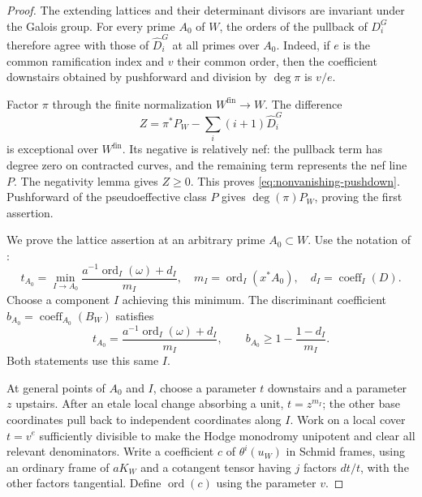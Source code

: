 \begin{proof}
The extending lattices and their determinant divisors are invariant
under the Galois group.  For every prime $A_0$ of $W$, the orders of the
pullback of $D_i^G$ therefore agree with those of $\widehat D_i^G$ at all
primes over $A_0$.  Indeed, if $e$ is the common ramification index and
$v$ their common order, then the coefficient downstairs obtained by
pushforward and division by $\deg\pi$ is $v/e$.

Factor $\pi$ through the finite normalization $W^{\mathrm{fin}}\to W$.
The difference
\[
                    Z=\pi^*P_W-\sum_i(i+1)\widehat D_i^G
\]
is exceptional over $W^{\mathrm{fin}}$.  Its negative is relatively nef:
the pullback term has degree zero on contracted curves, and the remaining
term represents the nef line $P$.  The negativity lemma
\cite[Lemma~3.39]{KollarMori} gives $Z\ge0$.  This proves
\eqref{eq:nonvanishing-pushdown}.  Pushforward of the pseudoeffective
class $P$ gives $\deg(\pi)P_W$, proving the first assertion.

We prove the lattice assertion at an arbitrary prime $A_0\subset W$.
Use the notation of :
\[
 t_{A_0}=\min_{I\to A_0}
       \frac{a^{-1}\operatorname{ord}_I(\omega)+d_I}{m_I},
 \quad m_I=\operatorname{ord}_I(x^*A_0),
 \quad d_I=\operatorname{coeff}_I(D).
\]
Choose a component $I$ achieving this minimum.  The discriminant
coefficient $b_{A_0}=\operatorname{coeff}_{A_0}(B_W)$ satisfies
\begin{equation}\label{eq:nonvanishing-same-minimizer}
 t_{A_0}=\frac{a^{-1}\operatorname{ord}_I(\omega)+d_I}{m_I},
 \qquad b_{A_0}\ge1-\frac{1-d_I}{m_I}.
\end{equation}
Both statements use this same $I$.

At general points of $A_0$ and $I$, choose a parameter $t$ downstairs
and a parameter $z$ upstairs.  After an etale local change absorbing a
unit, $t=z^{m_I}$; the other base coordinates pull back to independent
coordinates along $I$.  Work on a local cover $t=v^e$ sufficiently
divisible to make the Hodge monodromy unipotent and clear all relevant
denominators.  Write a coefficient $c$ of $\theta^i(u_W)$ in Schmid
frames, using an ordinary frame of $aK_W$ and a cotangent tensor having
$j$ factors $dt/t$, with the other factors tangential.  Define
$\operatorname{ord}(c)$ using the parameter $v$.


\end{proof}
